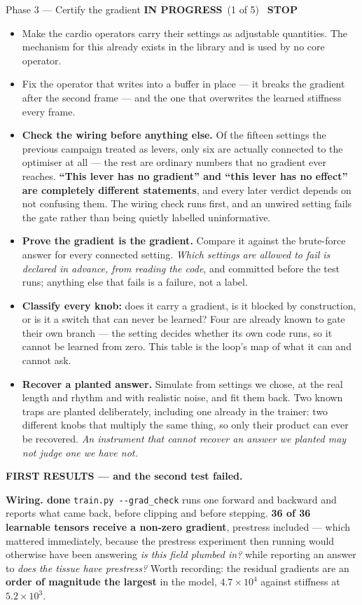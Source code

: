 \documentclass[11pt,a4paper]{article}
\newcommand{\code}[1]{\texttt{#1}}
\newcommand{\dn}{\textcolor{good}{\textbf{done}}}
\newcommand{\prog}{\textcolor{warn}{\textbf{IN PROGRESS}}}
\newcommand{\stopp}{\textcolor{bad!30!white}{\textbf{STOP}}}
\begin{document}
\begin{phasebox}{Phase 3 --- Certify the gradient \hfill \prog\ (1 of 5) \ \stopp}
\begin{itemize}
\item Make the cardio operators carry their settings as adjustable quantities. The mechanism for this
already exists in the library and is used by no core operator.
\item Fix the operator that writes into a buffer in place --- it breaks the gradient after the second
frame --- and the one that overwrites the learned stiffness every frame.
\item \textbf{Check the wiring before anything else.} Of the fifteen settings the previous campaign
treated as levers, only six are actually connected to the optimiser at all --- the rest are ordinary
numbers that no gradient ever reaches. \textbf{``This lever has no gradient'' and ``this lever has no
effect'' are completely different statements}, and every later verdict depends on not confusing
them. The wiring check runs first, and an unwired setting fails the gate rather than being quietly
labelled uninformative.
\item \textbf{Prove the gradient is the gradient.} Compare it against the brute-force answer for
every connected setting. \emph{Which settings are allowed to fail is declared in advance, from
reading the code}, and committed before the test runs; anything else that fails is a failure, not a
label.
\item \textbf{Classify every knob:} does it carry a gradient, is it blocked by construction, or is it
a switch that can never be learned? Four are already known to gate their own branch --- the setting
decides whether its own code runs, so it cannot be learned from zero. This table is the loop's map of
what it can and cannot ask.
\item \textbf{Recover a planted answer.} Simulate from settings we chose, at the real length and
rhythm and with realistic noise, and fit them back. Two known traps are planted deliberately,
including one already in the trainer: two different knobs that multiply the same thing, so only their
product can ever be recovered. \emph{An instrument that cannot recover an answer we planted may not
judge one we have not.}
\end{itemize}

\medskip
\textbf{FIRST RESULTS --- and the second test failed.}

\textbf{Wiring. \dn} \code{train.py -{}-grad\_check} runs one forward and backward and reports what
came back, before clipping and before stepping. \textbf{36 of 36 learnable tensors receive a
non-zero gradient}, prestress included --- which mattered immediately, because the prestress
experiment then running would otherwise have been answering \emph{is this field plumbed in?} while
reporting an answer to \emph{does the tissue have prestress?} Worth recording: the residual
gradients are an \textbf{order of magnitude the largest} in the model, $4.7\times10^{4}$ against
stiffness at $5.2\times10^{3}$.


\end{phasebox}
\end{document}
